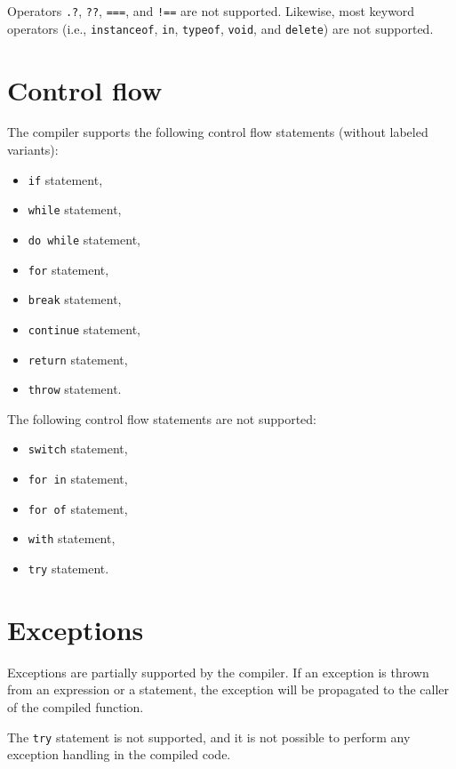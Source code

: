Operators \texttt{.?}, \texttt{??}, \texttt{===}, and \texttt{!==} are not supported. Likewise, most keyword operators (i.e., \texttt{instanceof}, \texttt{in}, \texttt{typeof}, \texttt{void}, and \texttt{delete}) are not supported.


\section{Control flow}

The compiler supports the following control flow statements (without labeled variants):
\begin{multicols}{2}
    \begin{itemize}
        \item \texttt{if} statement,
        \item \texttt{while} statement,
        \item \texttt{do while} statement,
        \item \texttt{for} statement,
        \item \texttt{break} statement,
        \item \texttt{continue} statement,
        \item \texttt{return} statement,
        \item \texttt{throw} statement.
    \end{itemize}
\end{multicols}

\noindent
The following control flow statements are not supported:
\begin{multicols}{2}
    \begin{itemize}
        \item \texttt{switch} statement,
        \item \texttt{for in} statement,
        \item \texttt{for of} statement,
        \item \texttt{with} statement,
        \item \texttt{try} statement.
        \vspace*{1.2\baselineskip}
    \end{itemize}
\end{multicols}


\section{Exceptions}

Exceptions are partially supported by the compiler. If an exception is thrown from an expression or a statement, the exception will be propagated to the caller of the compiled function.

The \texttt{try} statement is not supported, and it is not possible to perform any exception handling in the compiled code.
